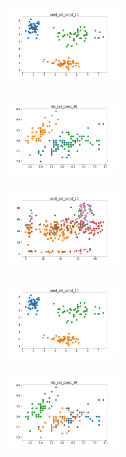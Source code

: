 \begin{figure}[H]
\begin{subfigure}
    \end{subfigure}
    \hfill
    \begin{subfigure}
        \centering
        \includegraphics[width=0.32\textwidth]{img/copkm2/rand_set_const_20_277451237_clust.png}
    \end{subfigure}
    \hfill
    \begin{subfigure}
        \centering
        \includegraphics[width=0.32\textwidth]{img/copkm2/iris_set_const_20_49258669_clust.png}
    \end{subfigure}
    \hfill
    \begin{subfigure}
        \centering
        \includegraphics[width=0.32\textwidth]{img/copkm2/ecoli_set_const_20_49258669_clust.png}
    \end{subfigure}
    \hfill
    \begin{subfigure}
        \centering
        \includegraphics[width=0.32\textwidth]{img/copkm2/rand_set_const_20_49258669_clust.png}
    \end{subfigure}
    \hfill
    \begin{subfigure}
        \centering
        \includegraphics[width=0.32\textwidth]{img/copkm2/iris_set_const_20_3773969821_clust.png}

\end{subfigure}
\end{figure}
